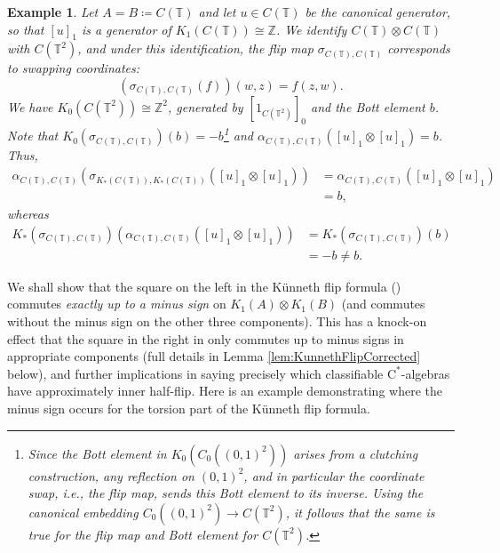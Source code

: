 \documentclass[a4paper,10pt]{amsart}
\newcommand{\cstar}{\ensuremath{\mathrm C^\ast}}
\newcounter{theorem}
\newtheorem{example}[theorem]{Example}
\numberwithin{equation}{section}
\numberwithin{theorem}{section}
\begin{document}
\begin{example}
\label{ex:bott-element}
Let $A=B \coloneqq C(\mathbb T)$ and let $u \in C(\mathbb T)$ be the canonical generator, so that $[u]_1$ is a generator of $K_1(C(\mathbb T)) \cong \mathbb Z$.
We identify $C(\mathbb T)\otimes C(\mathbb T)$ with $C(\mathbb T^2)$, and under this identification, the flip map $\sigma_{C(\mathbb T),C(\mathbb T)}$ corresponds to swapping coordinates:
\[ (\sigma_{C(\mathbb T),C(\mathbb T)}(f))(w,z) = f(z,w). \]
We have $K_0(C(\mathbb T^2)) \cong \mathbb Z^2$, generated by $[1_{C(\mathbb T^2)}]_0$ and the Bott element $b$.
Note that $K_0(\sigma_{C(\mathbb T),C(\mathbb T)})(b)= -b$\footnote{Since the Bott element in $K_0(C_0((0,1)^2))$ arises from a clutching construction, any reflection on $(0,1)^2$, and in particular the coordinate swap, i.e., the flip map, sends this Bott element to its inverse. Using the canonical embedding $C_0((0,1)^2) \to C(\mathbb T^2)$, it follows that the same is true for the flip map and Bott element for $C(\mathbb T^2)$.}
and $\alpha_{C(\mathbb T),C(\mathbb T)}([u]_1 \otimes [u]_1) = b$. Thus,
\begin{align*}
 \alpha_{C(\mathbb T),C(\mathbb T)}(\sigma_{K_*(C(\mathbb T)),K_*(C(\mathbb T))}([u]_1\otimes [u]_1))
& = 
 \alpha_{C(\mathbb T),C(\mathbb T)}([u]_1 \otimes [u]_1) \\
& = b, 
\end{align*}
whereas
\begin{align*}
	 K_*(\sigma_{C(\mathbb T),C(\mathbb T)})(\alpha_{C(\mathbb T),C(\mathbb T)}([u]_1 \otimes [u]_1))
 & = K_*(\sigma_{C(\mathbb T),C(\mathbb T)})(b) \\
& = -b \neq b.
\end{align*}
\end{example}

We shall show that the square on the left in the K\"unneth flip formula (\cite[Equation (4.2)]{aifK}) commutes \emph{exactly up to a minus sign} on $K_1(A)\otimes K_1(B)$ (and commutes without the minus sign on the other three components).
This has a knock-on effect that the square in the right in \cite[Equation (4.2)]{aifK} only commutes up to minus signs in appropriate components (full details in Lemma \ref{lem:KunnethFlipCorrected} below), and further implications in saying precisely which classifiable $\cstar$-algebras have approximately inner half-flip.
Here is an example demonstrating where the minus sign occurs for the torsion part of the K\"unneth flip formula.
\end{document}

